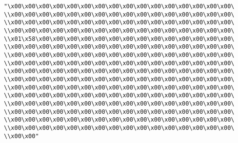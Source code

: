 \verb|"\x00\x00\x00\x00\x00\x00\x00\x00\x00\x00\x00\x00\x00\x00\x00\x00\|\newline
\verb|\\x00\x00\x00\x00\x00\x00\x00\x00\x00\x00\x00\x00\x00\x00\x00\x00\|\newline
\verb|\\x00\x00\x00\x00\x00\x00\x00\x00\x00\x00\x00\x00\x00\x00\x00\x00\|\newline
\verb|\\x00\x00\x00\x00\x00\x00\x00\x00\x00\x00\x00\x00\x00\x00\x00\x00\|\newline
\verb|\\x01\x58\x00\x00\x00\x00\x00\x00\x00\x00\x00\x00\x00\x00\x00\x00\|\newline
\verb|\\x00\x00\x00\x00\x00\x00\x00\x00\x00\x00\x00\x00\x00\x00\x00\x00\|\newline
\verb|\\x00\x00\x00\x00\x00\x00\x00\x00\x00\x00\x00\x00\x00\x00\x00\x00\|\newline
\verb|\\x00\x00\x00\x00\x00\x00\x00\x00\x00\x00\x00\x00\x00\x00\x00\x00\|\newline
\verb|\\x00\x00\x00\x00\x00\x00\x00\x00\x00\x00\x00\x00\x00\x00\x00\x00\|\newline
\verb|\\x00\x00\x00\x00\x00\x00\x00\x00\x00\x00\x00\x00\x00\x00\x00\x00\|\newline
\verb|\\x00\x00\x00\x00\x00\x00\x00\x00\x00\x00\x00\x00\x00\x00\x00\x00\|\newline
\verb|\\x00\x00\x00\x00\x00\x00\x00\x00\x00\x00\x00\x00\x00\x00\x00\x00\|\newline
\verb|\\x00\x00\x00\x00\x00\x00\x00\x00\x00\x00\x00\x00\x00\x00\x00\x00\|\newline
\verb|\\x00\x00\x00\x00\x00\x00\x00\x00\x00\x00\x00\x00\x00\x00\x00\x00\|\newline
\verb|\\x00\x00\x00\x00\x00\x00\x00\x00\x00\x00\x00\x00\x00\x00\x00\x00\|\newline
\verb|\\x00\x00\x00\x00\x00\x00\x00\x00\x00\x00\x00\x00\x00\x00\x00\x00\|\newline
\verb|\\x00\x00"|\newline
